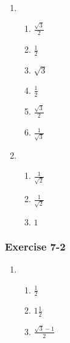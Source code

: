 {\begin{multicols}{3}
\begin{enumerate}[noitemsep, label=\textbf{\arabic*}. ]
\item %

\begin{enumerate}[itemsep=1pt, label=\textbf{(\alph*)} ]
\item $\frac{\sqrt{3}}{2}$%
\item $\frac{1}{2}$%
\item $\sqrt{3}$%
\item $\frac{1}{2}$%
\item $\frac{\sqrt{3}}{2}$%
\item $\frac{1}{\sqrt{3}}$%

\end{enumerate}


\item %


\begin{enumerate}[itemsep=1pt, label=\textbf{(\alph*)} ]
\item $\frac{1}{\sqrt{2}}$%
\item $\frac{1}{\sqrt{2}}$%
\item $1$%

\end{enumerate}
\end{enumerate}

\subsubsection*{Exercise 7-2} %

\begin{enumerate}[noitemsep, label=\textbf{\arabic*}. ] 
\item %
\begin{enumerate}[itemsep=1pt, label=\textbf{(\alph*)} ]
\item $\frac{1}{2}$%
\item $1\frac{1}{2}$%
\item $\frac{\sqrt{3}-1}{2}$%
\end{enumerate}


\end{enumerate}
\end{multicols}}
